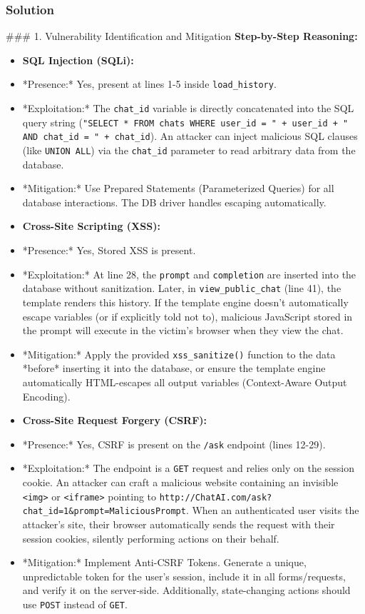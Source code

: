 \documentclass{article}
\begin{document}
\subsubsection*{Solution}
\#\#\# 1. Vulnerability Identification and Mitigation
\textbf{Step-by-Step Reasoning:}
\begin{itemize}
    \item \textbf{SQL Injection (SQLi):}
    \item *Presence:* Yes, present at lines 1-5 inside \texttt{load\_history}.
    \item *Exploitation:* The \texttt{chat\_id} variable is directly concatenated into the SQL query string (\texttt{"SELECT * FROM chats WHERE user\_id = " + user\_id + " AND chat\_id = " + chat\_id}). An attacker can inject malicious SQL clauses (like \texttt{UNION ALL}) via the \texttt{chat\_id} parameter to read arbitrary data from the database.
    \item *Mitigation:* Use Prepared Statements (Parameterized Queries) for all database interactions. The DB driver handles escaping automatically.
    \item \textbf{Cross-Site Scripting (XSS):}
    \item *Presence:* Yes, Stored XSS is present.
    \item *Exploitation:* At line 28, the \texttt{prompt} and \texttt{completion} are inserted into the database without sanitization. Later, in \texttt{view\_public\_chat} (line 41), the template renders this history. If the template engine doesn't automatically escape variables (or if explicitly told not to), malicious JavaScript stored in the prompt will execute in the victim's browser when they view the chat.
    \item *Mitigation:* Apply the provided \texttt{xss\_sanitize()} function to the data *before* inserting it into the database, or ensure the template engine automatically HTML-escapes all output variables (Context-Aware Output Encoding).
    \item \textbf{Cross-Site Request Forgery (CSRF):}
    \item *Presence:* Yes, CSRF is present on the \texttt{/ask} endpoint (lines 12-29).
    \item *Exploitation:* The endpoint is a \texttt{GET} request and relies only on the session cookie. An attacker can craft a malicious website containing an invisible \texttt{<img>} or \texttt{<iframe>} pointing to \texttt{http://ChatAI.com/ask?chat\_id=1\&prompt=MaliciousPrompt}. When an authenticated user visits the attacker's site, their browser automatically sends the request with their session cookies, silently performing actions on their behalf.
    \item *Mitigation:* Implement Anti-CSRF Tokens. Generate a unique, unpredictable token for the user's session, include it in all forms/requests, and verify it on the server-side. Additionally, state-changing actions should use \texttt{POST} instead of \texttt{GET}.

\end{itemize}
\end{document}
